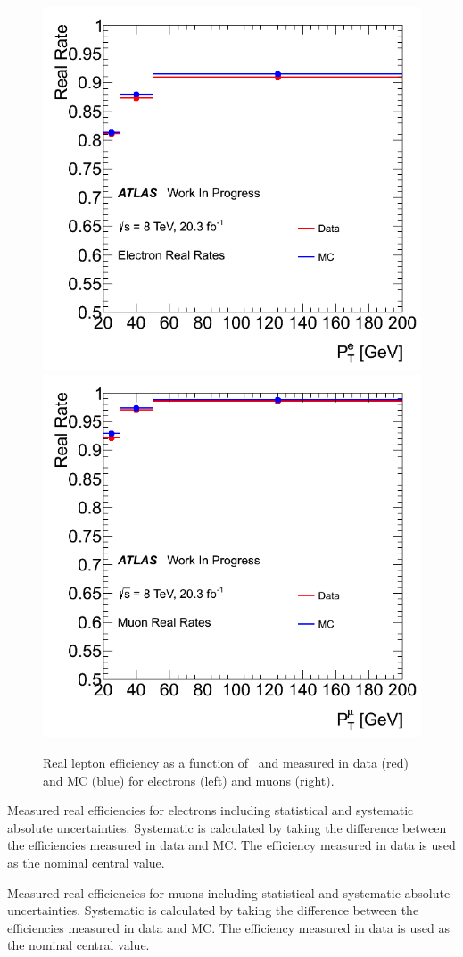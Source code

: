 \begin{figure}[ht!]
\centering
\includegraphics[width=0.45\columnwidth]{figures/fakes_bkg/Efficiencies/ElectronRealRates.png}
\includegraphics[width=0.45\columnwidth]{figures/fakes_bkg/Efficiencies/MuonRealRates.png}
\caption{Real lepton efficiency as a function of \pt\ and measured in data (red) and MC (blue) for electrons (left) and muons (right).}
\label{fig:realEff}
\end{figure}


\begin{table}[ht!]
\centering

\caption{Measured real efficiencies for electrons including statistical and systematic absolute uncertainties. 
Systematic is calculated by taking the difference
between the efficiencies measured in data and MC.  The efficiency measured in data is used as the nominal central value.
} 
\label{tab:realEff_El}
\end{table} 

\begin{table}[ht!]
\centering

\caption{Measured real efficiencies for muons including statistical and systematic absolute uncertainties.
Systematic is calculated by taking the difference
between the efficiencies measured in data and MC.  The efficiency measured in data is used as the nominal central value.
} 
\label{tab:realEff_Mu}
\end{table} 



